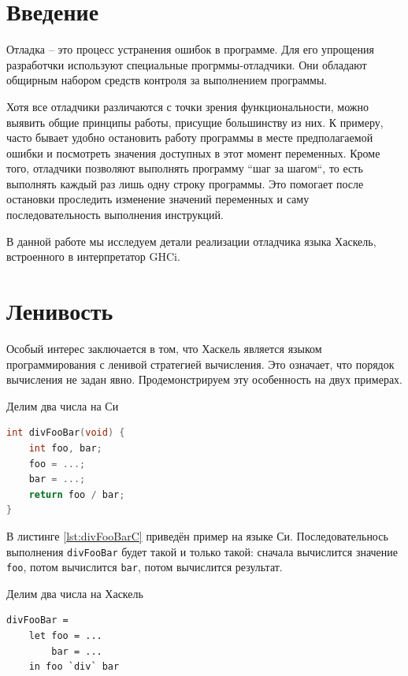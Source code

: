 \documentclass[fontsize=14pt, paper=a4, pagesize, DIV=calc]{scrartcl}
\def\code#1{\texttt{#1}}
\begin{document}
\tableofcontents
\newpage

\section{Введение}

Отладка -- это процесс устранения ошибок в программе. Для его упрощения
разработчки используют специальные прогрммы-отладчики. Они обладают общирным
набором средств контроля за выполнением программы. 

Хотя все отладчики различаются с точки зрения функциональности, можно выявить
общие принципы работы, присущие большинству из них. К примеру, часто бывает
удобно остановить работу программы в месте предполагаемой ошибки и посмотреть
значения доступных в этот момент переменных. Кроме того, отладчики позволяют
выполнять программу ``шаг за шагом``, то есть выполнять каждый раз лишь одну
строку программы. Это помогает после остановки проследить изменение значений
переменных и саму последовательность выполнения инструкций.

В данной работе мы исследуем детали реализации отладчика языка Хаскель,
встроенного в интерпретатор GHCi. 

\section{Ленивость}

Особый интерес заключается в том, что Хаскель является языком программирования
с ленивой стратегией вычисления. Это означает, что порядок вычисления не задан
явно. Продемонстрируем эту особенность на двух примерах.

\begin{ListingEnv}
\caption{Делим два числа на Си}
\label{lst:divFooBarC}
\begin{lstlisting}[language=c]
int divFooBar(void) {
    int foo, bar;
    foo = ...;
    bar = ...;
    return foo / bar;
}
\end{lstlisting}
\end{ListingEnv}

В листинге \ref{lst:divFooBarC} приведён пример на языке Си. Последовательнось
выполнения \code{divFooBar} будет такой и только такой: сначала вычислится
значение \code{foo}, потом вычислится \code{bar}, потом вычислится результат.

\begin{ListingEnv}
\caption{Делим два числа на Хаскель}
\label{lst:divFooBarHaskell}
\begin{lstlisting}
divFooBar =
    let foo = ...
        bar = ...
    in foo `div` bar
\end{lstlisting}
\end{ListingEnv}
\end{document}
